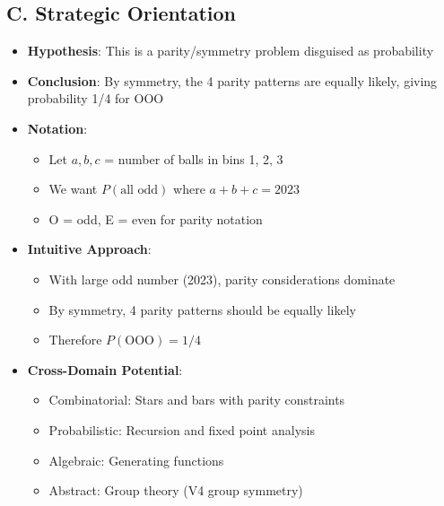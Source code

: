 \documentclass[12pt]{article}
\begin{document}
\begin{problemconfigbox}
\subsection*{C. Strategic Orientation}
\begin{itemize}[leftmargin=*]
    \item \textbf{Hypothesis}: This is a parity/symmetry problem disguised as probability
    \item \textbf{Conclusion}: By symmetry, the 4 parity patterns are equally likely, giving probability 1/4 for OOO
    \item \textbf{Notation}: 
    \begin{itemize}
        \item Let $a, b, c$ = number of balls in bins 1, 2, 3
        \item We want $P(\text{all odd})$ where $a + b + c = 2023$
        \item O = odd, E = even for parity notation
    \end{itemize}
    \item \textbf{Intuitive Approach}: 
    \begin{itemize}
        \item With large odd number (2023), parity considerations dominate
        \item By symmetry, 4 parity patterns should be equally likely
        \item Therefore $P(\text{OOO}) = 1/4$
    \end{itemize}
    \item \textbf{Cross-Domain Potential}: 
    \begin{itemize}
        \item Combinatorial: Stars and bars with parity constraints
        \item Probabilistic: Recursion and fixed point analysis
        \item Algebraic: Generating functions
        \item Abstract: Group theory (V4 group symmetry)
    \end{itemize}
\end{itemize}
\end{problemconfigbox}
\end{document}
